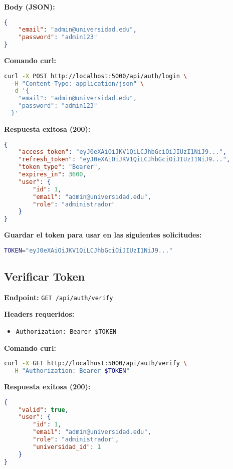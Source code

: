 \documentclass[12pt,a4paper]{article}
\begin{document}
\textbf{Body (JSON):}
\begin{lstlisting}[language=JSON]
{
    "email": "admin@universidad.edu",
    "password": "admin123"
}
\end{lstlisting}

\textbf{Comando curl:}
\begin{lstlisting}[language=bash]
curl -X POST http://localhost:5000/api/auth/login \
  -H "Content-Type: application/json" \
  -d '{
    "email": "admin@universidad.edu",
    "password": "admin123"
  }'
\end{lstlisting}

\textbf{Respuesta exitosa (200):}
\begin{lstlisting}[language=JSON]
{
    "access_token": "eyJ0eXAiOiJKV1QiLCJhbGciOiJIUzI1NiJ9...",
    "refresh_token": "eyJ0eXAiOiJKV1QiLCJhbGciOiJIUzI1NiJ9...",
    "token_type": "Bearer",
    "expires_in": 3600,
    "user": {
        "id": 1,
        "email": "admin@universidad.edu",
        "role": "administrador"
    }
}
\end{lstlisting}

\textbf{Guardar el token para usar en las siguientes solicitudes:}
\begin{lstlisting}[language=bash]
TOKEN="eyJ0eXAiOiJKV1QiLCJhbGciOiJIUzI1NiJ9..."
\end{lstlisting}

\subsection{Verificar Token}

\textbf{Endpoint:} \texttt{GET /api/auth/verify}

\textbf{Headers requeridos:}
\begin{itemize}
\item \texttt{Authorization: Bearer \$TOKEN}
\end{itemize}

\textbf{Comando curl:}
\begin{lstlisting}[language=bash]
curl -X GET http://localhost:5000/api/auth/verify \
  -H "Authorization: Bearer $TOKEN"
\end{lstlisting}

\textbf{Respuesta exitosa (200):}
\begin{lstlisting}[language=JSON]
{
    "valid": true,
    "user": {
        "id": 1,
        "email": "admin@universidad.edu",
        "role": "administrador",
        "universidad_id": 1
    }
}
\end{lstlisting}
\end{document}
